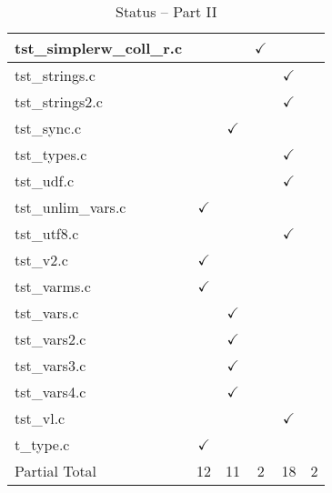\begin{table}[H]
\begin{tabular}{|l|c|c|c|c|c|}
tst\_simplerw\_coll\_r.c   &            &               & $\checkmark$  &               &               \\ \hline
tst\_strings.c          &               &               &               & $\checkmark$  &               \\ \hline
tst\_strings2.c         &               &               &               & $\checkmark$  &               \\ \hline
tst\_sync.c             &               & $\checkmark$  &               &               &               \\ \hline
tst\_types.c            &               &               &               & $\checkmark$  &               \\ \hline
tst\_udf.c              &               &               &               & $\checkmark$  &               \\ \hline
tst\_unlim\_vars.c      & $\checkmark$  &               &               &               &               \\ \hline
tst\_utf8.c             &               &               &               & $\checkmark$  &               \\ \hline
tst\_v2.c               & $\checkmark$  &               &               &               &               \\ \hline
tst\_varms.c            & $\checkmark$  &               &               &               &               \\ \hline
tst\_vars.c             &               & $\checkmark$  &               &               &               \\ \hline
tst\_vars2.c            &               & $\checkmark$  &               &               &               \\ \hline
tst\_vars3.c            &               & $\checkmark$  &               &               &               \\ \hline
tst\_vars4.c            &               & $\checkmark$  &               &               &               \\ \hline
tst\_vl.c               &               &               &               & $\checkmark$  &               \\ \hline
t\_type.c               & $\checkmark$  &               &               &               &               \\ \hline
\hline
Partial Total           &     12        &       11      &       2       &       18      &       2       \\ \hline
\end{tabular}
\caption{\label{tab:nc_test4_status_2} Status -- Part II}
\end{table}


